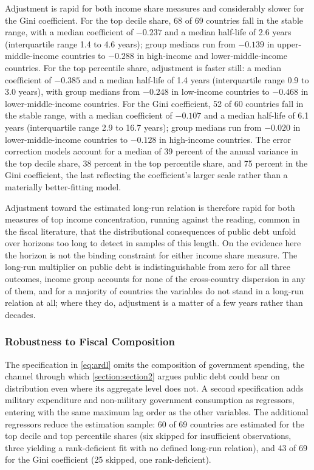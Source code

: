 \documentclass[12pt, titlepage]{article}
\numberwithin{equation}{section}
\begin{document}
Adjustment is rapid for both income share measures and considerably slower for
the Gini coefficient. For the top decile share, 68 of 69 countries fall in the
stable range, with a median coefficient of $-0.237$ and a median half-life of
2.6 years (interquartile range 1.4 to 4.6 years); group medians run from
$-0.139$ in upper-middle-income countries to $-0.288$ in high-income and
lower-middle-income countries. For the top percentile share, adjustment is
faster still: a median coefficient of $-0.385$ and a median half-life of 1.4
years (interquartile range 0.9 to 3.0 years), with group medians from $-0.248$
in low-income countries to $-0.468$ in lower-middle-income countries. For the
Gini coefficient, 52 of 60 countries fall in the stable range, with a median
coefficient of $-0.107$ and a median half-life of 6.1 years (interquartile
range 2.9 to 16.7 years); group medians run from $-0.020$ in
lower-middle-income countries to $-0.128$ in high-income countries. The error
correction models account for a median of 39 percent of the annual variance in
the top decile share, 38 percent in the top percentile share, and 75 percent
in the Gini coefficient, the last reflecting the coefficient's larger scale
rather than a materially better-fitting model.

Adjustment toward the estimated long-run relation is therefore rapid for both
measures of top income concentration, running against the reading, common in
the fiscal literature, that
the distributional consequences of public debt unfold over horizons too long
to detect in samples of this length. On the evidence here the horizon is not
the binding constraint for either income share measure. The long-run
multiplier on public debt is indistinguishable from zero for all three
outcomes, income group accounts for none of the cross-country dispersion in
any of them, and for a majority of countries the variables do not stand in a
long-run relation at all; where they do, adjustment is a matter of a few years
rather than decades.

\subsubsection{Robustness to Fiscal Composition}

The specification in \eqref{eq:ardl} omits the composition of government
spending, the channel through which \autoref{section:section2} argues public
debt could bear on distribution even where its aggregate level does not. A
second specification adds military expenditure and non-military government
consumption as regressors, entering with the same maximum lag order as the
other variables. The additional regressors reduce the estimation sample: 60 of
69 countries are estimated for the top decile and top percentile shares (six
skipped for insufficient observations, three yielding a rank-deficient fit
with no defined long-run relation), and 43 of 69 for the Gini coefficient (25
skipped, one rank-deficient).
\end{document}
